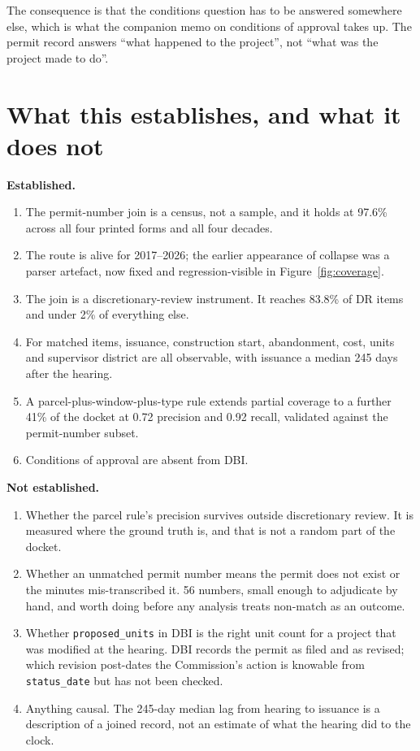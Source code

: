 \documentclass[11pt]{article}
\begin{document}
The consequence is that the conditions question has to be answered somewhere else, which is
what the companion memo on conditions of approval takes up. The permit record answers
``what happened to the project'', not ``what was the project made to do''.

\section{What this establishes, and what it does not}

\textbf{Established.}
\begin{enumerate}
\item The permit-number join is a census, not a sample, and it holds at 97.6\% across all four
printed forms and all four decades.
\item The route is alive for 2017--2026; the earlier appearance of collapse was a parser
artefact, now fixed and regression-visible in Figure~\ref{fig:coverage}.
\item The join is a discretionary-review instrument. It reaches 83.8\% of DR items and under
2\% of everything else.
\item For matched items, issuance, construction start, abandonment, cost, units and
supervisor district are all observable, with issuance a median 245 days after the hearing.
\item A parcel-plus-window-plus-type rule extends partial coverage to a further 41\% of the
docket at 0.72 precision and 0.92 recall, validated against the permit-number subset.
\item Conditions of approval are absent from DBI.
\end{enumerate}

\textbf{Not established.}
\begin{enumerate}
\item Whether the parcel rule's precision survives outside discretionary review. It is
measured where the ground truth is, and that is not a random part of the docket.
\item Whether an unmatched permit number means the permit does not exist or the minutes
mis-transcribed it. 56 numbers, small enough to adjudicate by hand, and worth doing before
any analysis treats non-match as an outcome.
\item Whether \texttt{proposed\_units} in DBI is the right unit count for a project that was
modified at the hearing. DBI records the permit as filed and as revised; which revision
post-dates the Commission's action is knowable from \texttt{status\_date} but has not been
checked.
\item Anything causal. The 245-day median lag from hearing to issuance is a description of a
joined record, not an estimate of what the hearing did to the clock.
\end{enumerate}
\end{document}
